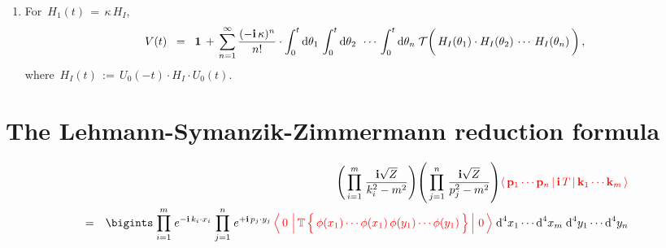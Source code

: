 \begin{proposition}
\begin{enumerate}
	\begin{equation*}
	\mathcal{T}\!\left(\,
		\overset{{\color{white}1}}{\widetilde{H}_{1}(\theta_{1})}
		\cdot
		\widetilde{H}_{1}(\theta_{2})
		\,\cdots\,
		\widetilde{H}_{1}(\theta_{n})
		\,\right)
	\;\; := \;\;
		\overset{{\color{white}1}}{\widetilde{H}_{1}(\theta_{\sigma(1)})}
		\cdot
		\widetilde{H}_{1}(\theta_{\sigma(2)})
		\,\cdots\,
		\widetilde{H}_{1}(\theta_{\sigma(n)})\,,
	\end{equation*}
	where \,$\sigma \in S_{n}$\, is any permutation of $\{1,2,\cdots,n\}$ such that
	\begin{equation*}
	\theta_{\sigma(1)} \; \leq \; \theta_{\sigma(2)} \; \leq \; \cdots \; \leq \; \theta_{\sigma(n)}
	\end{equation*}
\item
	For \,$H_{1}(t) \,=\, \kappa\,H_{I}$,\,
	\begin{equation*}
	V(t) \;\; = \;\; \mathbf{1} \, + \,
		\overset{\infty}{\underset{n = 1}{\sum}}\, \dfrac{(-\i\,\kappa)^{n}}{n!}
		\cdot
		\int_{0}^{t}\d\theta_{1} \, \int_{0}^{t}\d\theta_{2} \;\, \cdots \,  \int_{0}^{t}\d\theta_{n}\;
			\mathcal{T}\!\left(\,
				\overset{{\color{white}1}}{H_{I}(\theta_{1})}
				\cdot
				H_{I}(\theta_{2})
				\,\cdots\,
				H_{I}(\theta_{n})
				\,\right),
	\end{equation*}
	where \,$H_{I}(t) \, := \, U_{0}(-t) \cdot H_{I} \cdot U_{0}(t)$.
\end{enumerate}
\end{proposition}


\vskip 0.5cm
\section{The Lehmann-Symanzik-Zimmermann reduction formula}


\begin{eqnarray*}
&&
	\left(\,
	    \overset{m}{\underset{i=1}{\prod}}\;
	    \dfrac{\i\sqrt{Z}}{k_{i}^{2}-m^{2}}
	    \right)
	\!
	\left(\,
	    \overset{n}{\underset{j=1}{\prod}}\;
	    \dfrac{\i\sqrt{Z}}{p_{j}^{2}-m^{2}}
	    \right)
	\!
	{\color{red}
	\left\langle\,
	    \mathbf{p}_{1} \cdots \mathbf{p}_{n}
	    \,\vert\,
	    \i\,T
	    \,\vert\,
	    \mathbf{k}_{1} \cdots \mathbf{k}_{m}
	    \,\right\rangle
	}
\\
& = &
    \bigints\;
	    \overset{m}{\underset{i=1}{\prod}}\;e^{-\i\,k_{i} \cdot x_{i}}
	    \;
	    \overset{n}{\underset{j=1}{\prod}}\;e^{+\i\,p_{j} \cdot y_{j}}
	    \,
    	{\color{red}
		\left\langle\,
		    0
		    \,\left\vert\,
		    \mathbb{T}\left\{\,
		        \overset{{\color{white}.}}{\phi(x_{1})\cdots\phi(x_{1})}
		        \,
		        \phi(y_{1})\cdots\phi(y_{1})
		        \,\right\}
		    \,\right\vert\,
		    0
		    \,\right\rangle
		}
		\;
		\d^{4}x_{1} \cdots \d^{4}x_{m}
		\;
		\d^{4}y_{1} \cdots \d^{4}y_{n}
\end{eqnarray*}

